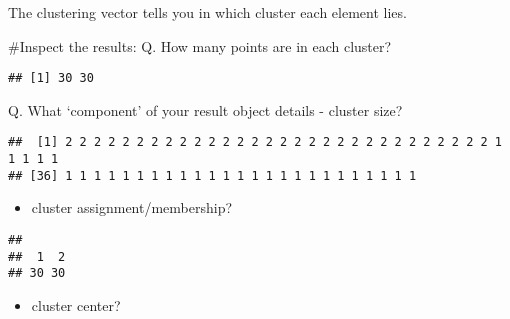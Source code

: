 \documentclass[]{article}
\newenvironment{Shaded}{\begin{snugshade}}{\end{snugshade}}
\newcommand{\KeywordTok}[1]{\textcolor[rgb]{0.13,0.29,0.53}{\textbf{#1}}}
\newcommand{\NormalTok}[1]{#1}
\newcommand{\OperatorTok}[1]{\textcolor[rgb]{0.81,0.36,0.00}{\textbf{#1}}}
\providecommand{\tightlist}{%
  \setlength{\itemsep}{0pt}\setlength{\parskip}{0pt}}
\begin{document}
The clustering vector tells you in which cluster each element lies.

\#Inspect the results: Q. How many points are in each cluster?

\begin{Shaded}
\end{Shaded}

\begin{verbatim}
## [1] 30 30
\end{verbatim}

Q. What `component' of your result object details - cluster size?

\begin{Shaded}
\end{Shaded}

\begin{verbatim}
##  [1] 2 2 2 2 2 2 2 2 2 2 2 2 2 2 2 2 2 2 2 2 2 2 2 2 2 2 2 2 2 2 1 1 1 1 1
## [36] 1 1 1 1 1 1 1 1 1 1 1 1 1 1 1 1 1 1 1 1 1 1 1 1 1
\end{verbatim}

\begin{itemize}
\tightlist
\item
  cluster assignment/membership?
\end{itemize}

\begin{Shaded}
\end{Shaded}

\begin{verbatim}
## 
##  1  2 
## 30 30
\end{verbatim}

\begin{itemize}
\tightlist
\item
  cluster center?
\end{itemize}

\begin{Shaded}
\end{Shaded}
\end{document}
